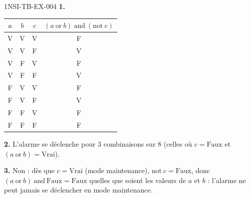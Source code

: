 \begin{corrige}{1NSI-TB-EX-004}
\textbf{1.}
\begin{center}
\begin{tabular}{ccc|c}
  $a$ & $b$ & $c$ & $(a\ \text{or}\ b)\ \text{and}\ (\text{not}\ c)$ \\\hline
  V & V & V & F \\
  V & V & F & V \\
  V & F & V & F \\
  V & F & F & V \\
  F & V & V & F \\
  F & V & F & V \\
  F & F & V & F \\
  F & F & F & F \\
\end{tabular}
\end{center}

\textbf{2.} L'alarme se déclenche pour $3$ combinaisons sur $8$ (celles où $c=\text{Faux}$
et $(a\ \text{or}\ b)=\text{Vrai}$).

\textbf{3.} Non : dès que $c=\text{Vrai}$ (mode maintenance), $\text{not}\ c=\text{Faux}$,
donc $(a\ \text{or}\ b)\ \text{and}\ \text{Faux}=\text{Faux}$ quelles que soient les valeurs
de $a$ et $b$ : l'alarme ne peut jamais se déclencher en mode maintenance.
\end{corrige}
